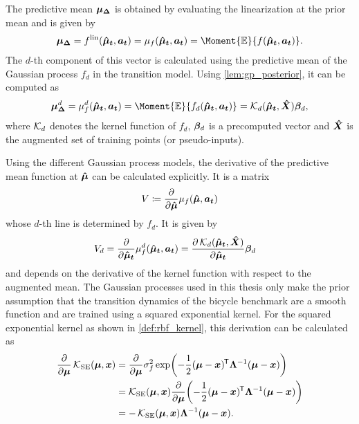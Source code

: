 The predictive mean $\bm{\mu_\Delta}$ is obtained by evaluating the linearization at the prior mean and is given by
\begin{align}
    \rv{\mu_\Delta} = \lin{f}(\mat{\hat{\mu}_t}, \mat{a_t}) = \mu_f(\mat{\hat{\mu}_t}, \mat{a_t}) = \Moment{\E}{f(\rv{\hat{\mu}_t}, \mat{a_t})}.
\end{align}
The $d$-th component of this vector is calculated using the predictive mean of the Gaussian process $f_d$ in the transition model.
Using \cref{lem:gp_posterior}, it can be computed as
\begin{align}
    \rv{\mu_\Delta}^d = \mu_f^d(\rv{\hat{\mu}_t}, \mat{a_t}) = \Moment{\E}{f_d(\rv{\hat{\mu}_t}, \mat{a_t})} = \K_d( \rv{\hat{\mu}_t}, \mat{\hat{X}})\mat{\beta}_d,
\end{align}
where $\operatorname{\mathcal{K}}_d$ denotes the kernel function of $f_d$, $\bm{\beta}_d$ is a precomputed vector and $\bm{\hat{X}}$ is the augmented set of training points (or pseudo-inputs).

Using the different Gaussian process models, the derivative of the predictive mean function at $\bm{\hat{\mu}}$ can be calculated explicitly.
It is a matrix
\begin{align}
    V \coloneqq \frac{\partial}{\partial \bm{\hat{\mu}}} \mu_f(\bm{\hat{\mu}}, \bm{a_t})
\end{align}
whose $d$-th line is determined by $f_d$.
It is given by
\begin{align}
    V_d &= \frac{\partial}{\partial \bm{\hat{\mu}_t}}\mu_f^d(\bm{\hat{\mu}_t}, \bm{a_t}) = \frac{\partial \operatorname{\mathcal{K}}_d(\bm{\hat{\mu}_t}, \bm{\hat{X}})}{\partial \bm{\hat{\mu}_t}}\bm{\beta}_d
\end{align}
and depends on the derivative of the kernel function with respect to the augmented mean.
The Gaussian processes used in this thesis only make the prior assumption that the transition dynamics of the bicycle benchmark are a smooth function and are trained using a squared exponential kernel.
For the squared exponential kernel as shown in \cref{def:rbf_kernel}, this derivation can be calculated as
\begin{align}
    \frac{\partial}{\partial \bm{\mu}}\operatorname{\mathcal{K}}_{\text{SE}}(\bm{\mu}, \bm{x}) &= \frac{\partial}{\partial \bm{\mu}} \sigma_f^2 \exp\!\left( -\frac{1}{2} (\bm{\mu} - \bm{x})^{\mkern-1.5mu\mathsf{T}} \bm{\Lambda}^{-1} (\bm{\mu} - \bm{x}) \right) \\
    &= \operatorname{\mathcal{K}}_{\text{SE}}(\bm{\mu}, \bm{x}) \frac{\partial}{\partial \bm{\mu}}\!\left( -\frac{1}{2} (\bm{\mu} - \bm{x})^{\mkern-1.5mu\mathsf{T}} \bm{\Lambda}^{-1} (\bm{\mu} - \bm{x}) \right) \\
    &= -\operatorname{\mathcal{K}}_{\text{SE}}(\bm{\mu}, \bm{x}) \bm{\Lambda}^{-1} (\bm{\mu} - \bm{x}).
\end{align}

